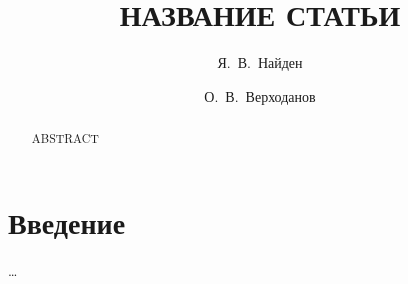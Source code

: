 \documentclass[aps,12pt,final,notitlepage,oneside,onecolumn,nobibnotes,%
nofootinbib,superscriptaddress,noshowpacs,centertags]{revtex4}
\begin{document}

    \title{НАЗВАНИЕ СТАТЬИ}

    \author{Я.~В.~Найден}
    \affiliation{\saonamer}

    \author{О.~В.~Верходанов}
    \affiliation{\saonamer}


    \begin{abstract}
        ABSTRACT
    \end{abstract}

    \maketitle

    \section{Введение}
        \ldots

\end{document}

